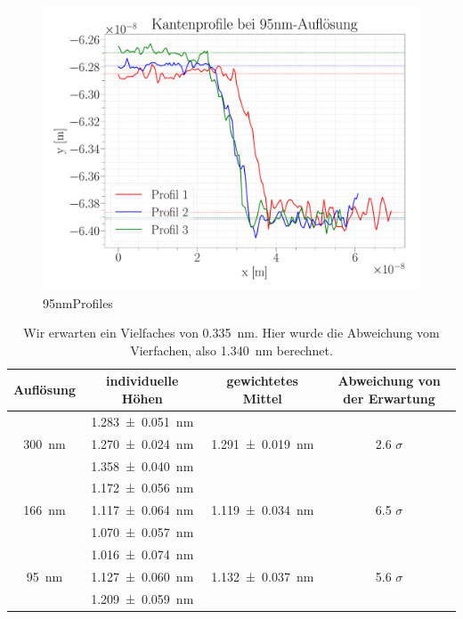 \begin{figure}[H]
\centering
\includegraphics[width=\textwidth]{../Figures/95nm_profiles.pdf}
\caption{95nmProfiles}
\label{95nmProfiles}
\end{figure}

\begin{table}[H]
	\renewcommand{\arraystretch}{1.5}
	\centering
	\begin{tabular}{|c|c|c|c|}
		\hline
		Auflösung & individuelle Höhen & gewichtetes Mittel & Abweichung von der Erwartung \\
		\hline
		\multirow{3}{*}{\SI{300}{nm}} & \SI{1.283+-0.051}{nm} & \multirow{3}{*}{\SI{1.291+-0.019}{nm}} & \multirow{3}{*}{2.6 $\sigma$} \\
		 & \SI{1.270+-0.024}{nm} & & \\
		 & \SI{1.358+-0.040}{nm} & & \\
		\hline
		\multirow{3}{*}{\SI{166}{nm}} & \SI{1.172+-0.056}{nm} & \multirow{3}{*}{\SI{1,119+-0,034}{nm}} & \multirow{3}{*}{6.5 $\sigma$} \\
		 & \SI{1.117+-0.064}{nm} & & \\
		 & \SI{1.070+-0.057}{nm} & & \\
		\hline
		\multirow{3}{*}{\SI{95}{nm}} & \SI{1.016+-0.074}{nm} & \multirow{3}{*}{\SI{1,132+-0,037}{nm}} & \multirow{3}{*}{5.6 $\sigma$} \\
		 & \SI{1.127+-0.060}{nm} & & \\
		 & \SI{1.209+-0.059}{nm} & & \\
		\hline
	\end{tabular}
	\caption{Wir erwarten ein Vielfaches von \SI{0,335}{nm}. Hier wurde die Abweichung vom Vierfachen, also \SI{1,340}{nm} berechnet.}
	\label{tab:heights}
\end{table}

